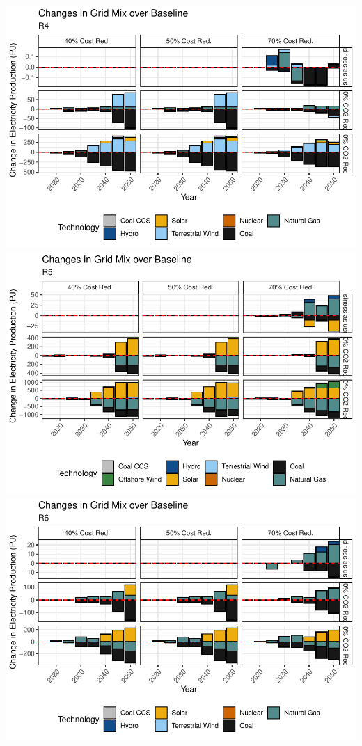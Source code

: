 \documentclass[]{article}
\begin{document}
\includegraphics{osw_Report_files/figure-latex/unnamed-chunk-57-4.pdf}
\includegraphics{osw_Report_files/figure-latex/unnamed-chunk-57-5.pdf}
\includegraphics{osw_Report_files/figure-latex/unnamed-chunk-57-6.pdf}
\end{document}
